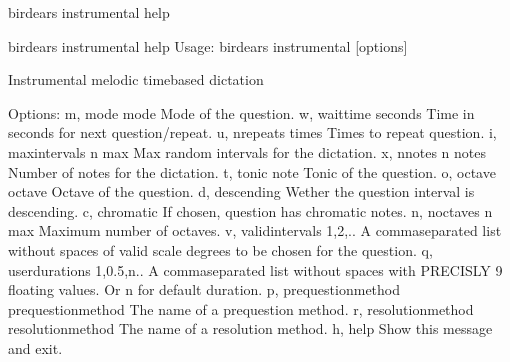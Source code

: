 \documentclass[letterpaper,10pt,english]{sphinxmanual}
\begin{document}
\begin{sphinxVerbatim}[commandchars=\\\{\}]
birdears instrumental \PYGZhy{}\PYGZhy{}help
\end{sphinxVerbatim}

\begin{sphinxVerbatim}[commandchars=\\\{\}]
\PYGZdl{} birdears instrumental \PYGZhy{}\PYGZhy{}help
Usage: birdears instrumental [options]

  Instrumental melodic time\PYGZhy{}based dictation

Options:
  \PYGZhy{}m, \PYGZhy{}\PYGZhy{}mode \PYGZlt{}mode\PYGZgt{}               Mode of the question.
  \PYGZhy{}w, \PYGZhy{}\PYGZhy{}wait\PYGZus{}time \PYGZlt{}seconds\PYGZgt{}       Time in seconds for next question/repeat.
  \PYGZhy{}u, \PYGZhy{}\PYGZhy{}n\PYGZus{}repeats \PYGZlt{}times\PYGZgt{}         Times to repeat question.
  \PYGZhy{}i, \PYGZhy{}\PYGZhy{}max\PYGZus{}intervals \PYGZlt{}n max\PYGZgt{}     Max random intervals for the dictation.
  \PYGZhy{}x, \PYGZhy{}\PYGZhy{}n\PYGZus{}notes \PYGZlt{}n notes\PYGZgt{}         Number of notes for the dictation.
  \PYGZhy{}t, \PYGZhy{}\PYGZhy{}tonic \PYGZlt{}note\PYGZgt{}              Tonic of the question.
  \PYGZhy{}o, \PYGZhy{}\PYGZhy{}octave \PYGZlt{}octave\PYGZgt{}           Octave of the question.
  \PYGZhy{}d, \PYGZhy{}\PYGZhy{}descending                Wether the question interval is descending.
  \PYGZhy{}c, \PYGZhy{}\PYGZhy{}chromatic                 If chosen, question has chromatic notes.
  \PYGZhy{}n, \PYGZhy{}\PYGZhy{}n\PYGZus{}octaves \PYGZlt{}n max\PYGZgt{}         Maximum number of octaves.
  \PYGZhy{}v, \PYGZhy{}\PYGZhy{}valid\PYGZus{}intervals \PYGZlt{}1,2,..\PYGZgt{}  A comma\PYGZhy{}separated list without spaces
                                  of valid scale degrees to be chosen for the
                                  question.
  \PYGZhy{}q, \PYGZhy{}\PYGZhy{}user\PYGZus{}durations \PYGZlt{}1,0.5,n..\PYGZgt{}
                                  A comma\PYGZhy{}separated list without
                                  spaces with PRECISLY 9 floating values. Or
                                  \PYGZsq{}n\PYGZsq{} for default              duration.
  \PYGZhy{}p, \PYGZhy{}\PYGZhy{}prequestion\PYGZus{}method \PYGZlt{}prequestion\PYGZus{}method\PYGZgt{}
                                  The name of a pre\PYGZhy{}question method.
  \PYGZhy{}r, \PYGZhy{}\PYGZhy{}resolution\PYGZus{}method \PYGZlt{}resolution\PYGZus{}method\PYGZgt{}
                                  The name of a resolution method.
  \PYGZhy{}h, \PYGZhy{}\PYGZhy{}help                      Show this message and exit.


\end{sphinxVerbatim}
\end{document}
